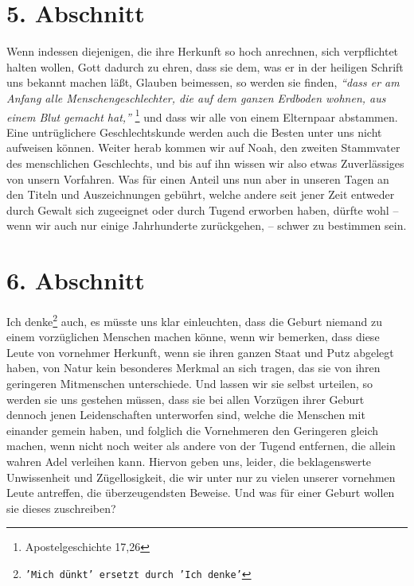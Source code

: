 \section{5. Abschnitt} \label{kap11_ab5}

Wenn indessen diejenigen, die ihre Herkunft so hoch anrechnen, sich verpflichtet
halten wollen, Gott dadurch zu ehren, dass sie dem, was er in der heiligen
Schrift uns bekannt machen läßt, Glauben beimessen, so werden sie finden,
\textit{"`dass
er am Anfang alle Menschengeschlechter, die auf dem ganzen Erdboden wohnen,
aus einem Blut gemacht hat,"'}
\footnote{Apostelgeschichte 17,26}
und dass wir alle
von einem Elternpaar abstammen. Eine untrüglichere Geschlechtskunde werden auch
die Besten unter uns nicht aufweisen können. Weiter herab kommen wir auf
Noah, den zweiten Stammvater des menschlichen Geschlechts,
und bis auf ihn
wissen wir also etwas Zuverlässiges von unsern Vorfahren. Was für einen Anteil
uns nun aber in unseren Tagen an den Titeln und Auszeichnungen gebührt, welche
andere seit jener Zeit entweder durch Gewalt sich zugeeignet oder
durch Tugend
erworben haben, dürfte wohl -- wenn wir auch nur einige Jahrhunderte
zurückgehen, -- schwer zu bestimmen sein.

\section{6. Abschnitt} \label{kap11_ab6}

Ich denke\footnote{\texttt{'Mich dünkt' ersetzt durch 'Ich denke'}} auch, es müsste uns klar einleuchten, dass die Geburt niemand zu einem
vorzüglichen Menschen machen könne, wenn wir bemerken, dass diese Leute von
vornehmer Herkunft, wenn sie ihren ganzen Staat und Putz abgelegt haben, von
Natur kein besonderes Merkmal an sich tragen, das sie von ihren geringeren
Mitmenschen unterschiede. Und lassen wir sie selbst urteilen, so werden sie
uns gestehen müssen, dass sie bei allen Vorzügen ihrer Geburt dennoch jenen
Leidenschaften unterworfen sind, welche die Menschen mit
einander gemein haben,
und folglich die Vornehmeren den Geringeren gleich machen, wenn nicht noch weiter
als andere von der Tugend entfernen, die allein wahren Adel verleihen kann.
Hiervon geben uns, leider, die beklagenswerte Unwissenheit und Zügellosigkeit,
die wir unter nur zu vielen unserer vornehmen Leute antreffen, die
überzeugendsten Beweise. Und was für einer Geburt wollen sie dieses zuschreiben?

